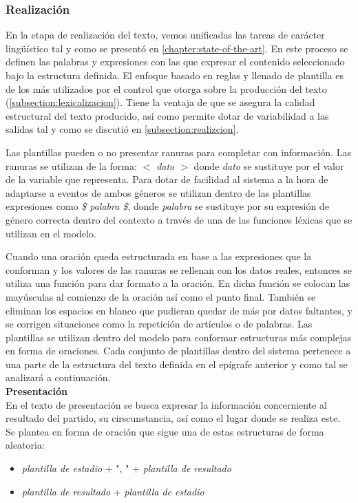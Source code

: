 \subsubsection{Realización}

    En la etapa de realización del texto, vemos unificadas las tareas de carácter lingüístico tal y como se presentó en \ref{chapter:state-of-the-art}. 
En este proceso se definen las palabras y expresiones con las que expresar el contenido seleccionado bajo la estructura definida. El enfoque basado en reglas 
y llenado de plantilla es de los más utilizados por el control que otorga sobre la producción del texto (\ref{subsection:lexicalizacion}). Tiene la ventaja de que 
se asegura la calidad estructural del texto producido, así como permite dotar de variabilidad a las salidas tal y como se discutió en \ref{subsection:realizcion}.

    Las plantillas pueden o no presentar ranuras para completar con información. Las ranuras se utilizan de la forma: \textit{$<$ dato $>$} donde 
\textit{dato} se sustituye por el valor de la variable que representa. Para dotar de facilidad al sistema a la hora de adaptarse a eventos de 
ambos géneros se utilizan dentro de las plantillas expresiones como \textit{\$ palabra \$}, donde \textit{palabra} se sustituye por su expresión de 
género correcta dentro del contexto a través de una de las funciones léxicas que se utilizan en el modelo. 

    Cuando una oración queda estructurada en base a las expresiones que la conforman y los valores de las ranuras se rellenan con los datos reales, entonces 
se utiliza una función para dar formato a la oración. En dicha función se colocan las mayúsculas al comienzo de la oración así como el punto final. También se 
eliminan los espacios en blanco que pudieran quedar de más por datos faltantes, y se corrigen situaciones como la repetición de artículos o de palabras.
    Las plantillas se utilizan dentro del modelo para conformar estructuras más complejas en forma de 
oraciones. Cada conjunto de plantillas dentro del sistema pertenece a una parte de la estructura del texto definida en el ep\'igrafe anterior y como 
tal se analizará a continuación.\\

    \textbf{Presentación}\\

    En el texto de presentación se busca expresar la información concerniente al resultado del partido, su cirscunstancia, así como el lugar donde se 
realiza este. Se plantea en forma de oración que sigue una de estas estructuras de forma aleatoria:
    \begin{itemize}
        \item \textit{plantilla de estadio} $+$ ", " $+$ \textit{plantilla de resultado}
        \item \textit{plantilla de resultado} + \textit{plantilla de estadio}
    \end{itemize}
        
